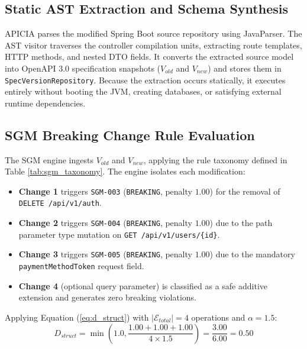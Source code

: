 \documentclass[conference]{IEEEtran}
\begin{document}
\subsection{Static AST Extraction and Schema Synthesis}
APICIA parses the modified Spring Boot source repository using JavaParser. The AST visitor traverses the controller compilation units, extracting route templates, HTTP methods, and nested DTO fields. It converts the extracted source model into OpenAPI 3.0 specification snapshots ($V_{old}$ and $V_{new}$) and stores them in \texttt{SpecVersionRepository}. Because the extraction occurs statically, it executes entirely without booting the JVM, creating databases, or satisfying external runtime dependencies.

\subsection{SGM Breaking Change Rule Evaluation}
The SGM engine ingests $V_{old}$ and $V_{new}$, applying the rule taxonomy defined in Table \ref{tab:sgm_taxonomy}. The engine isolates each modification:
\begin{itemize}
    \item \textbf{Change 1} triggers \texttt{SGM-003} (\texttt{BREAKING}, penalty $1.00$) for the removal of \texttt{DELETE /api/v1/auth}.
    \item \textbf{Change 2} triggers \texttt{SGM-004} (\texttt{BREAKING}, penalty $1.00$) due to the path parameter type mutation on \texttt{GET /api/v1/users/\{id\}}.
    \item \textbf{Change 3} triggers \texttt{SGM-005} (\texttt{BREAKING}, penalty $1.00$) due to the mandatory \texttt{paymentMethodToken} request field.
    \item \textbf{Change 4} (optional query parameter) is classified as a safe additive extension and generates zero breaking violations.
\end{itemize}

Applying Equation (\ref{eq:d_struct}) with $|\mathcal{E}_{total}| = 4$ operations and $\alpha = 1.5$:
\begin{equation}
D_{struct} = \min\left(1.0, \frac{1.00 + 1.00 + 1.00}{4 \times 1.5}\right) = \frac{3.00}{6.00} = 0.50
\end{equation}
\end{document}
